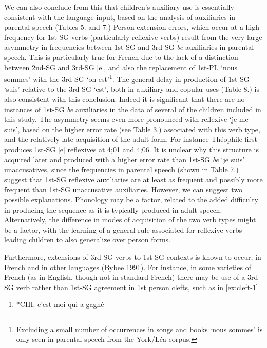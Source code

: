\documentclass[
  12pt,
]{article}
\begin{document}
\begin{enumerate}[resume*]
\begin{enumerate}[resume*]
\begin{enumerate}[resume*]
\begin{enumerate}[resume*]
\begin{enumerate}[resume*]
We can also conclude from this that children's auxiliary use is essentially consistent with the language input, based on the analysis of auxiliaries in parental speech (Tables 5. and 7.) Person extension errors, which occur at a high frequency for 1st-SG verbs (particularly reflexive verbs) result from the very large asymmetry in frequencies between 1st-SG and 3rd-SG \emph{be} auxiliaries in parental speech. This is particularly true for French due to the lack of a distinction between 2nd-SG and 3rd-SG {[}e{]}, and also the replacement of 1st-PL `nous sommes' with the 3rd-SG `on est'\footnote{Excluding a small number of occurrences in songs and books `nous sommes' is only seen in parental speech from the York/Léa corpus.}. The general delay in production of 1st-SG `suis' relative to the 3rd-SG `est', both in auxiliary and copular uses (Table 8.) is also consistent with this conclusion. Indeed it is significant that there are no instances of 1st-SG \emph{be} auxiliaries in the data of several of the children included in this study. The asymmetry seems even more pronounced with reflexive `je me suis', based on the higher error rate (see Table 3.) associated with this verb type, and the relatively late acquisition of the adult form. For instance Théophile first produces 1st-SG {[}e{]} reflexives at 4;01 and 4;06. It is unclear why this structure is acquired later and produced with a higher error rate than 1st-SG \emph{be} `je suis' unaccusatives, since the frequencies in parental speech (shown in Table 7.) suggest that 1st-SG reflexive auxiliaries are at least as frequent and possibly more frequent than 1st-SG unaccusative auxiliaries. However, we can suggest two possible explanations. Phonology may be a factor, related to the added difficulty in producing the sequence \textipa{[Z m@ s4i]} as it is typically produced in adult speech. Alternatively, the difference in modes of acquisition of the two verb types might be a factor, with the learning of a general rule associated for reflexive verbs leading children to also generalize over person forms.

Furthermore, extensions of 3rd-SG verbs to 1st-SG contexts is known to occur, in French and in other languages (Bybee 1991). For instance, in some varieties of French (as in English, though not in standard French) there may be use of a 3rd-SG verb rather than 1st-SG agreement in 1st person clefts, such as in \ref{ex:cleft-1}

\begin{enumerate}[resume*]
  \item{*CHI:   c'est moi qui a gagné \label{ex:cleft-1}}
    

\end{enumerate}
\end{enumerate}
\end{enumerate}
\end{enumerate}
\end{enumerate}
\end{enumerate}
\end{document}
